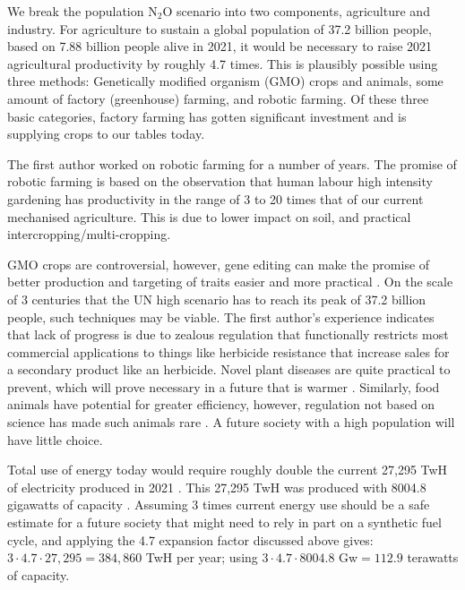 \documentclass{article}
\begin{document}
We break the population N$_2$O scenario into two components, agriculture and industry. For agriculture to sustain a global population of 37.2 billion people, based on 7.88 billion people alive in 2021, it would be necessary to raise 2021 agricultural productivity by roughly 4.7 times. This is plausibly possible using three methods: Genetically modified organism (GMO) crops and animals, some amount of factory (greenhouse) farming, and robotic farming. Of these three basic categories, factory farming has gotten significant investment and is supplying crops to our tables today. 

The first author worked on robotic farming for a number of years. The promise of robotic farming is based on the observation that human labour high intensity gardening has productivity in the range of 3 to 20 times that of our current mechanised agriculture. This is due to lower impact on soil, and practical intercropping/multi-cropping. 

GMO crops are controversial, however, gene editing can make the promise of better production and targeting of traits easier and more practical \cite{Labant2020RedesignFoodSupply} . On the scale of 3 centuries that the UN high scenario \cite{UN2004WorldPopTo2300} has to reach its peak of 37.2 billion people, such techniques may be viable. The first author's experience indicates that lack of progress is due to zealous regulation that functionally restricts most commercial applications to things like herbicide resistance that increase sales for a secondary product like an herbicide. Novel plant diseases are quite practical to prevent, which will prove necessary in a future that is warmer \cite{Juroszek202030yrReviewClimateCrop}\cite{Parker2020FoodSecurityClimate}. Similarly, food animals have potential for greater efficiency, however, regulation not based on science has made such animals rare \cite{Murray2016GeneEngLivestock}. A future society with a high population will have little choice. 

Total use of energy today would require roughly double the current 27,295 TwH of electricity produced in 2021 \cite{EIA2021IntNatElectWorld}. This 27,295 TwH was produced with 8004.8 gigawatts of capacity \cite{GlobalEconomy2021lectCapacity}. Assuming 3 times current energy use should be a safe estimate for a future society that might need to rely in part on a synthetic fuel cycle, and applying the 4.7 expansion factor discussed above gives:   $3\cdot 4.7 \cdot 27,295 = 384,860 $ TwH per year; using $3\cdot 4.7 \cdot 8004.8 $ Gw$ = 112.9$ terawatts of capacity. 
\end{document}
